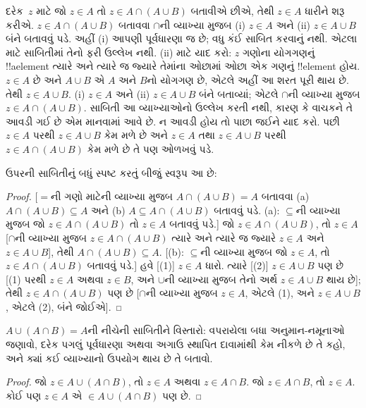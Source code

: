 \documentclass[../../../include/open-logic-section]{subfiles}
\begin{document}
દરેક~$z$ માટે જો $z \in A$ તો $z \in A \cap (A \cup B)$
બતાવીએ છીએ, તેથી $z \in A$ ધારીને શરૂ કરીએ. $z
\in A \cap (A \cup B)$ બતાવવા $\cap$ની વ્યાખ્યા મુજબ
(i) $z \in A$ અને (ii) $z \in A \cup B$ બંને બતાવવું પડે.
અહીં (i) આપણી પૂર્વધારણા જ છે; વધુ કંઈ સાબિત કરવાનું નથી.
એટલા માટે સાબિતીમાં તેનો ફરી ઉલ્લેખ નથી. (ii) માટે યાદ કરો:
$z$ ગણોના યોગગણનું !!a{element} ત્યારે અને ત્યારે જ જ્યારે
તેમાંના ઓછામાં ઓછા એક ગણનું !!{element} હોય. $z \in A$
છે અને $A \cup B$ એ $A$ અને $B$નો યોગગણ છે, એટલે અહીં
આ શરત પૂરી થાય છે. તેથી $z \in A \cup B$. (i) $z \in A$
અને (ii) $z \in A \cup B$ બંને બતાવ્યાં; એટલે $\cap$ની
વ્યાખ્યા મુજબ $z \in A \cap (A \cup B)$. સાબિતી આ
વ્યાખ્યાઓનો ઉલ્લેખ કરતી નથી, કારણ કે વાચકને તે આવડી ગઈ છે
એમ માનવામાં આવે છે. ન આવડી હોય તો પાછા જઈને યાદ કરો.
પછી $z
\in A$ પરથી $z \in A \cup B$ કેમ મળે છે અને $z \in A$
તથા $z \in A \cup B$ પરથી $z \in A \cap (A \cup B)$
કેમ મળે છે તે પણ ઓળખવું પડે.

ઉપરની સાબિતીનું બધું સ્પષ્ટ કરતું બીજું સ્વરૂપ આ છે:
\begin{proof}{}
[$=$ની ગણો માટેની વ્યાખ્યા મુજબ $A \cap (A \cup B) = A$
બતાવવા (a) $A \cap (A \cup B) \subseteq A$ અને
(b) $A \subseteq A \cap (A \cup B)$ બતાવવું પડે. (a): $\subseteq$ની વ્યાખ્યા
મુજબ જો $z \in A \cap (A \cup B)$ તો $z \in A$ બતાવવું પડે.]
જો $z \in A
\cap (A \cup B)$, તો $z \in A$ [$\cap$ની વ્યાખ્યા મુજબ
$z
  \in A \cap (A \cup B)$ ત્યારે અને ત્યારે જ જ્યારે
$z \in A$ અને $z \in A \cup B$], તેથી $A
\cap (A \cup B) \subseteq A$. [(b): $\subseteq$ની વ્યાખ્યા
મુજબ જો $z \in A$, તો $z \in A \cap (A \cup B)$ બતાવવું પડે.]
હવે [(1)] $z \in A$ ધારો. ત્યારે [(2)] $z \in A \cup B$ પણ છે
[(1) પરથી $z \in A$ અથવા $z \in B$, અને $\cup$ની વ્યાખ્યા
મુજબ તેનો અર્થ $z
  \in A \cup B$ થાય છે]; તેથી $z \in A \cap (A \cup B)$ પણ
છે [$\cap$ની વ્યાખ્યા મુજબ $z \in A$, એટલે (1), અને
$z
  \in A \cup B$, એટલે (2), બંને જોઈએ].
\end{proof}


\begin{prob}
$A \cup (A \cap B) = A$ની નીચેની સાબિતીને વિસ્તારો:
વપરાયેલા બધા અનુમાન-નમૂનાઓ જણાવો, દરેક પગલું પૂર્વધારણા
અથવા અગાઉ સ્થાપિત દાવામાંથી કેમ નીકળે છે તે કહો, અને
ક્યાં કઈ વ્યાખ્યાનો ઉપયોગ થાય છે તે બતાવો.
\begin{proof}
  જો $z \in A \cup (A \cap B)$, તો $z \in A$ અથવા
  $z \in A \cap B$. જો $z \in A \cap B$, તો $z \in A$.
  કોઈ પણ $z \in A$ એ $\in A \cup (A
  \cap B)$ પણ છે.
\end{proof}
\end{prob}
\end{document}

